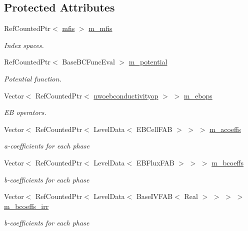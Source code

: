 \subsection*{Protected Attributes}
\begin{DoxyCompactItemize}
\item 
Ref\+Counted\+Ptr$<$ \hyperlink{classmfis}{mfis} $>$ \hyperlink{classnwomfconductivityop_acce8fedb84d502e40cb99bb82019fa55}{m\+\_\+mfis}
\begin{DoxyCompactList}\small\item\em Index spaces. \end{DoxyCompactList}\item 
Ref\+Counted\+Ptr$<$ Base\+B\+C\+Func\+Eval $>$ \hyperlink{classnwomfconductivityop_a9e47bf000bacf30039a4ac16c57f4462}{m\+\_\+potential}
\begin{DoxyCompactList}\small\item\em Potential function. \end{DoxyCompactList}\item 
Vector$<$ Ref\+Counted\+Ptr$<$ \hyperlink{classnwoebconductivityop}{nwoebconductivityop} $>$ $>$ \hyperlink{classnwomfconductivityop_a2e24efc817e0570afda1d8b103bddc36}{m\+\_\+ebops}
\begin{DoxyCompactList}\small\item\em EB operators. \end{DoxyCompactList}\item 
Vector$<$ Ref\+Counted\+Ptr$<$ Level\+Data$<$ E\+B\+Cell\+F\+AB $>$ $>$ $>$ \hyperlink{classnwomfconductivityop_a5c8391dce6ff744cd80a1d8fd6c83230}{m\+\_\+acoeffs}
\begin{DoxyCompactList}\small\item\em a-\/coefficients for each phase \end{DoxyCompactList}\item 
Vector$<$ Ref\+Counted\+Ptr$<$ Level\+Data$<$ E\+B\+Flux\+F\+AB $>$ $>$ $>$ \hyperlink{classnwomfconductivityop_a3db3b15e614b2ab9e8d1ddfa6b1bde93}{m\+\_\+bcoeffs}
\begin{DoxyCompactList}\small\item\em b-\/coefficients for each phase \end{DoxyCompactList}\item 
Vector$<$ Ref\+Counted\+Ptr$<$ Level\+Data$<$ Base\+I\+V\+F\+AB$<$ Real $>$ $>$ $>$ $>$ \hyperlink{classnwomfconductivityop_ae8a7be66f4b90c63b1da9319cd9c188e}{m\+\_\+bcoeffs\+\_\+irr}
\begin{DoxyCompactList}\small\item\em b-\/coefficients for each phase \end{DoxyCompactList}\item 

\end{DoxyCompactItemize}
